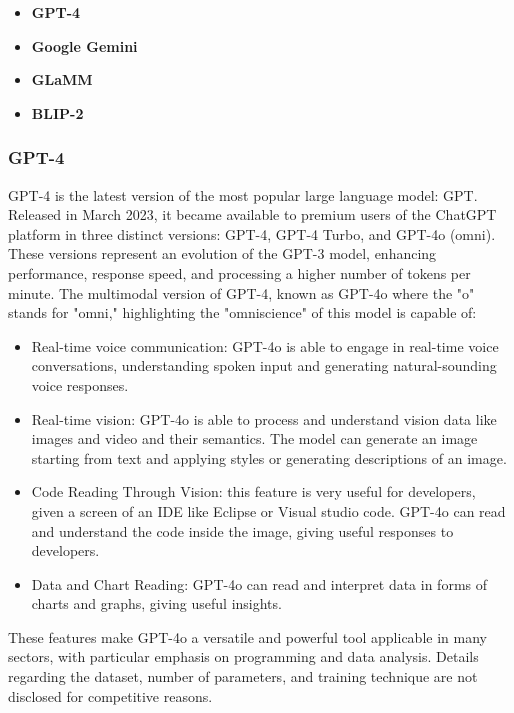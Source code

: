 \begin{itemize}
    \item \textbf{GPT-4}

    \item \textbf{Google Gemini} 

    \item \textbf{GLaMM}

    \item \textbf{BLIP-2}
\end{itemize}

\subsubsection{GPT-4}
GPT-4 is the latest version of the most popular large language model: GPT. Released in March 2023, it became available to premium users of the ChatGPT platform in three distinct versions: GPT-4, GPT-4 Turbo, and GPT-4o (omni). These versions represent an evolution of the GPT-3 model, enhancing performance, response speed, and processing a higher number of tokens per minute.\cite{insights_gpt4} The multimodal version of GPT-4, known as GPT-4o where the "o" stands for "omni," highlighting the "omniscience" of this model is capable of:
\begin{itemize}
    \item Real-time voice communication: GPT-4o is able to engage in real-time voice conversations, understanding spoken input and generating natural-sounding voice responses.

    \item Real-time vision: GPT-4o is able to process and understand vision data like images and video and their semantics. The model can generate an image starting from text and applying styles or generating descriptions of an image.

    \item Code Reading Through Vision: this feature is very useful for developers, given a screen of an IDE like Eclipse or Visual studio code. GPT-4o can read and understand the code inside the image, giving useful responses to developers.

    \item Data and Chart Reading: GPT-4o can read and interpret data in forms of charts and graphs, giving useful insights.
\end{itemize}
These features make GPT-4o a versatile and powerful tool applicable in many sectors, with particular emphasis on programming and data analysis. Details regarding the dataset, number of parameters, and training technique are not disclosed for competitive reasons.

